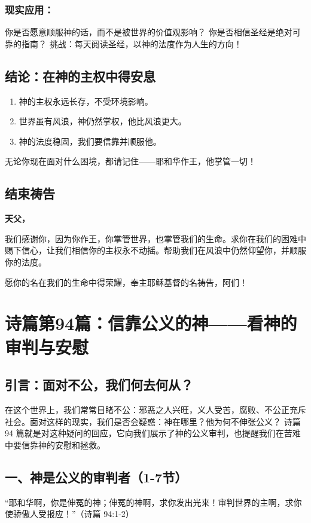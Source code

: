 \documentclass[a4paper, 12pt]{article}
\begin{document}
\subsubsection*{现实应用：}

你是否愿意顺服神的话，而不是被世界的价值观影响？
你是否相信圣经是绝对可靠的指南？
挑战：每天阅读圣经，以神的法度作为人生的方向！

\subsection*{结论：在神的主权中得安息}
\begin{enumerate}
    \item 神的主权永远长存，不受环境影响。

    \item 世界虽有风浪，神仍然掌权，他比风浪更大。

    \item 神的法度稳固，我们要信靠并顺服他。

\end{enumerate}

无论你现在面对什么困境，都请记住——耶和华作王，他掌管一切！

\subsection*{结束祷告}
\textbf{天父，}

我们感谢你，因为你作王，你掌管世界，也掌管我们的生命。求你在我们的困难中赐下信心，让我们相信你的主权永不动摇。帮助我们在风浪中仍然仰望你，并顺服你的法度。

愿你的名在我们的生命中得荣耀，奉主耶稣基督的名祷告，阿们！
\newpage
\section{诗篇第94篇：信靠公义的神——看神的审判与安慰}
\subsection*{引言：面对不公，我们何去何从？}
在这个世界上，我们常常目睹不公：邪恶之人兴旺，义人受苦，腐败、不公正充斥社会。面对这样的现实，我们是否会疑惑：神在哪里？他为何不伸张公义？ 诗篇 94 篇就是对这种疑问的回应，它向我们展示了神的公义审判，也提醒我们在苦难中要信靠神的安慰和拯救。

\subsection*{一、神是公义的审判者（1-7节）}
“耶和华啊，你是伸冤的神；伸冤的神啊，求你发出光来！审判世界的主啊，求你使骄傲人受报应！”（诗篇 94:1-2）
\end{document}
